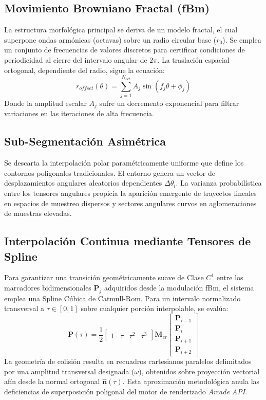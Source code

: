 \documentclass[10pt,twocolumn,letterpaper]{article}
\begin{document}
\subsection{Movimiento Browniano Fractal (fBm)}
La estructura morfológica principal se deriva de un modelo fractal, el cual superpone ondas armónicas (octavas) sobre un radio circular base ($r_0$). Se emplea un conjunto de frecuencias de valores discretos para certificar condiciones de periodicidad al cierre del intervalo angular de $2\pi$. La traslación espacial ortogonal, dependiente del radio, sigue la ecuación:
\begin{equation}
r_{offset}(\theta) = \sum_{j=1}^{N_{oct}} A_j \sin(f_j \theta + \phi_j)
\end{equation}
Donde la amplitud escalar $A_j$ sufre un decremento exponencial para filtrar variaciones en las iteraciones de alta frecuencia.

\subsection{Sub-Segmentación Asimétrica}
Se descarta la interpolación polar paramétricamente uniforme que define los contornos poligonales tradicionales. El entorno genera un vector de desplazamientos angulares aleatorios dependientes $\Delta\theta_i$. La varianza probabilística entre los tensores angulares propicia la aparición emergente de trayectos lineales en espacios de muestreo dispersos y sectores angulares curvos en aglomeraciones de muestras elevadas.

\subsection{Interpolación Continua mediante Tensores de Spline}
Para garantizar una transición geométricamente suave de Clase $C^1$ entre los marcadores bidimensionales $\mathbf{P}_j$ adquiridos desde la modulación fBm, el sistema emplea una Spline Cúbica de Catmull-Rom. Para un intervalo normalizado transversal a $\tau \in [0,1]$ sobre cualquier porción interpolable, se evalúa:
\begin{equation} 
\mathbf{P}(\tau) = \frac{1}{2}
\begin{bmatrix} 1 & \tau & \tau^2 & \tau^3 \end{bmatrix}
\mathbf{M}_{cr}
\begin{bmatrix} \mathbf{P}_{i-1} \\ \mathbf{P}_i \\ \mathbf{P}_{i+1} \\ \mathbf{P}_{i+2} \end{bmatrix}
\end{equation}
La geometría de colisión resulta en recuadros cartesianos paralelos delimitados por una amplitud transversal designada ($\omega$), obtenidos sobre proyección vectorial afín desde la normal ortogonal $\hat{\mathbf{n}}(\tau)$. Esta aproximación metodológica anula las deficiencias de superposición poligonal del motor de renderizado \textit{Arcade API}.
\end{document}
